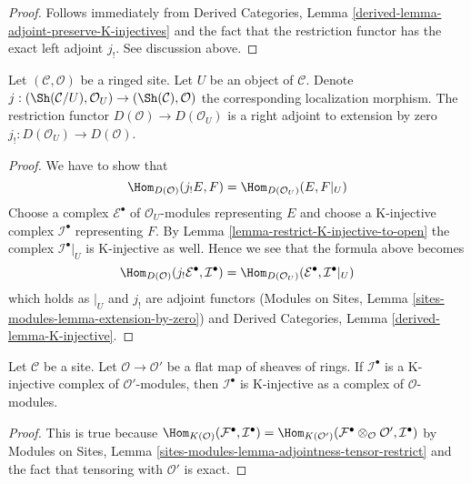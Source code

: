 \begin{proof}
Follows immediately from
Derived Categories, Lemma \ref{derived-lemma-adjoint-preserve-K-injectives}
and the fact that the restriction functor has the
exact left adjoint $j_!$. See discussion above.
\end{proof}

\begin{lemma}
\label{lemma-adjoint-lower-shriek-restrict}
Let $(\mathcal{C}, \mathcal{O})$ be a ringed site. Let $U$ be an
object of $\mathcal{C}$. Denote
$j : (\Sh(\mathcal{C}/U), \mathcal{O}_U) \to (\Sh(\mathcal{C}), \mathcal{O})$
the corresponding localization morphism. The restriction functor
$D(\mathcal{O}) \to D(\mathcal{O}_U)$ is a right adjoint to
extension by zero $j_! : D(\mathcal{O}_U) \to D(\mathcal{O})$.
\end{lemma}

\begin{proof}
We have to show that
$$
\Hom_{D(\mathcal{O})}(j_!E, F) = \Hom_{D(\mathcal{O}_U)}(E, F|_U)
$$
Choose a complex $\mathcal{E}^\bullet$ of $\mathcal{O}_U$-modules
representing $E$ and choose
a K-injective complex $\mathcal{I}^\bullet$ representing $F$.
By Lemma \ref{lemma-restrict-K-injective-to-open} the complex
$\mathcal{I}^\bullet|_U$ is K-injective as well. Hence we see that
the formula above becomes
$$
\Hom_{D(\mathcal{O})}(j_!\mathcal{E}^\bullet, \mathcal{I}^\bullet) =
\Hom_{D(\mathcal{O}_U)}(\mathcal{E}^\bullet, \mathcal{I}^\bullet|_U)
$$
which holds as $|_U$ and $j_!$ are adjoint functors
(Modules on Sites, Lemma \ref{sites-modules-lemma-extension-by-zero})
and
Derived Categories, Lemma \ref{derived-lemma-K-injective}.
\end{proof}

\begin{lemma}
\label{lemma-K-injective-flat}
Let $\mathcal{C}$ be a site. Let $\mathcal{O} \to \mathcal{O}'$ be a flat
map of sheaves of rings. If $\mathcal{I}^\bullet$ is a K-injective
complex of $\mathcal{O}'$-modules, then $\mathcal{I}^\bullet$ is K-injective
as a complex of $\mathcal{O}$-modules.
\end{lemma}

\begin{proof}
This is true because
$\Hom_{K(\mathcal{O})}(\mathcal{F}^\bullet, \mathcal{I}^\bullet) =
\Hom_{K(\mathcal{O}')}(\mathcal{F}^\bullet \otimes_\mathcal{O} \mathcal{O}',
\mathcal{I}^\bullet)$ by
Modules on Sites, Lemma \ref{sites-modules-lemma-adjointness-tensor-restrict}
and the fact that tensoring with $\mathcal{O}'$ is exact.
\end{proof}

